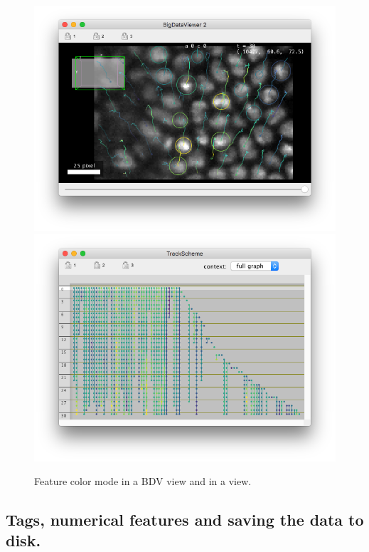 \begin{figure}
    \centering
    \null\hfill
    \includegraphics[height=0.23\textheight]{figures/Mastodon_FeatureColorBDV.png}
    \hfill
    \includegraphics[height=0.23\textheight]{figures/Mastodon_FeatureColorTrackScheme.png}
    \hfill\null
    
    \caption{Feature color mode in a BDV view and in a \TrackScheme view.  }
    \label{fig:FeatureColorModeView}
\end{figure}


\subsection{Tags, numerical features and saving the data to disk.}

